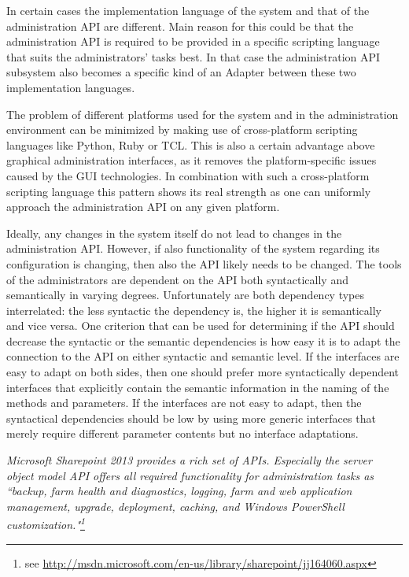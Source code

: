 In certain cases the implementation language of the system and that of the administration API are different. Main reason for this could be that the administration API is required to be provided in a specific scripting language that suits the administrators' tasks best. In that case the administration API subsystem also becomes a specific kind of an {\sc Adapter} \cite{Gamma95} between these two implementation languages.

The problem of different platforms used for the system and in the administration environment can be minimized by making use of cross-platform scripting languages like Python, Ruby or TCL. This is also a certain advantage above graphical administration interfaces, as it removes the platform-specific issues caused by the GUI technologies. In combination with such a cross-platform scripting language this pattern shows its real strength as one can uniformly approach the administration API on any given platform.

Ideally, any changes in the system itself do not lead to changes in the administration API. However, if also functionality of the system regarding its configuration is changing, then also the API likely needs to be changed. The tools of the administrators are dependent on the API both syntactically and semantically in varying degrees. Unfortunately are both dependency types interrelated: the less syntactic the dependency is, the higher it is semantically and vice versa. One criterion that can be used for determining if the API should decrease the syntactic or the semantic dependencies is how easy it is to adapt the connection to the API on either syntactic and semantic level. If the interfaces are easy to adapt on both sides, then one should prefer more syntactically dependent interfaces that explicitly contain the semantic information in the naming of the methods and parameters. If the interfaces are not easy to adapt, then the syntactical dependencies should be low by using more generic interfaces that merely require different parameter contents but no interface adaptations.  



\textit{Microsoft Sharepoint 2013 provides a rich set of APIs. Especially the server object model API offers all required functionality for administration tasks as ``backup, farm health and diagnostics, logging, farm and web application management, upgrade, deployment, caching, and Windows PowerShell customization."\footnote{see \url{http://msdn.microsoft.com/en-us/library/sharepoint/jj164060.aspx}}}

